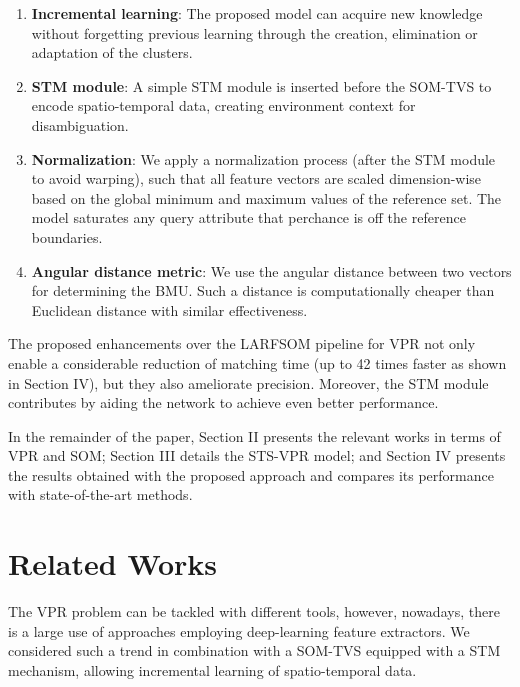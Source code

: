 \documentclass[letterpaper, 10 pt, conference]{ieeeconf}  %
\begin{document}
\begin{enumerate}
\item \textbf{Incremental learning}: The proposed model can acquire new knowledge without forgetting previous learning through the creation, elimination or adaptation of the clusters.
\item \textbf{STM module}: A simple STM module is inserted before the \ac{SOM-TVS} to encode spatio-temporal data, creating environment context for disambiguation.
\item \textbf{Normalization}: We apply a normalization process (after the STM module to avoid warping), such that all feature vectors are scaled dimension-wise based on the global minimum and maximum values of the reference set. The model saturates any query attribute that perchance is off the reference boundaries.
\item \textbf{Angular distance metric}: We use the angular distance between two vectors for determining the BMU. Such a distance is computationally cheaper than Euclidean distance with similar effectiveness.

\end{enumerate}

The proposed enhancements over the LARFSOM pipeline for VPR not only enable a considerable reduction of matching time (up to 42 times faster as shown in Section IV), but they also ameliorate precision. Moreover, the STM module contributes by aiding the network to achieve even better performance. 

In the remainder of the paper, Section II presents the relevant works in terms of \ac{VPR} and \ac{SOM}; Section III details the STS-VPR model; and Section IV presents the results obtained with the proposed approach and compares its performance with state-of-the-art methods.


\section{Related Works}

The \ac{VPR} problem can be tackled with different tools, however, nowadays, there is a large use of approaches employing deep-learning feature extractors. We considered such a trend in combination with a \ac{SOM-TVS} equipped with a \ac{STM} mechanism, allowing incremental learning of spatio-temporal data.   
\end{document}
